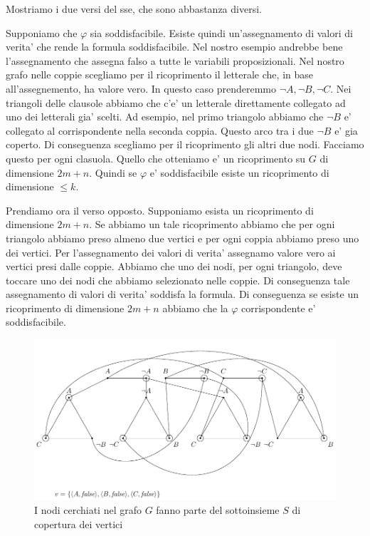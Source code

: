 Mostriamo i due versi del sse, che sono abbastanza diversi.

Supponiamo che $\varphi$ sia soddisfacibile. Esiste quindi un'assegnamento di valori di verita' che
rende la formula soddisfacibile. Nel nostro esempio andrebbe bene l'assegnamento che assegna falso a
tutte le variabili proposizionali. Nel nostro grafo nelle coppie scegliamo per il ricoprimento il
letterale che, in base all'assegnemento, ha valore vero. In questo caso prenderemmo $\lnot A, \lnot
B, \lnot C$. Nei triangoli delle clausole abbiamo che c'e' un letterale direttamente collegato ad
uno dei letterali gia' scelti. Ad esempio, nel primo triangolo abbiamo che $\lnot B$ e' collegato al
corrispondente nella seconda coppia. Questo arco tra i due $\lnot B$ e' gia coperto. Di conseguenza
scegliamo per il ricoprimento gli altri due nodi. Facciamo questo per ogni clasuola. Quello che
otteniamo e' un ricoprimento su $G$ di dimensione $2m + n$. Quindi se $\varphi$ e' soddisfacibile
esiste un ricoprimento di dimensione $\leq k$.

Prendiamo ora il verso opposto. Supponiamo esista un ricoprimento di dimensione $2m + n$. Se abbiamo
un tale ricoprimento abbiamo che per ogni triangolo abbiamo preso almeno due vertici e per ogni
coppia abbiamo preso uno dei vertici. Per l'assegnamento dei valori di verita' assegnamo valore vero
ai vertici presi dalle coppie. Abbiamo che uno dei nodi, per ogni triangolo, deve toccare uno dei
nodi che abbiamo selezionato nelle coppie. Di conseguenza tale assegnamento di valori di verita'
soddisfa la formula. Di conseguenza se esiste un ricoprimento di dimensione $2m + n$ abbiamo che la
$\varphi$ corrispondente e' soddisfacibile.

\begin{figure}[h]
    \begin{center}
        \includegraphics[scale=0.75]{./img/NPClass/SATtoVC3.pdf}
        \caption{I nodi cerchiati nel grafo $G$ fanno parte del sottoinsieme $S$ di copertura dei
        vertici}
    \end{center}
\end{figure}

